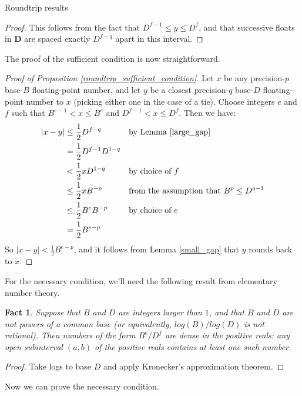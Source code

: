 \documentclass{article}
\theoremstyle{plain}
\newtheorem{fact}[lemma]{Fact}
\theoremstyle{definition}
\begin{document}
\begin{section}{Roundtrip results}
\begin{proof}
  This follows from the fact that $D^{f-1} \le y \le D^f$, and that successive
  floats in $\mathbf D$ are spaced exactly $D^{f-q}$ apart in this interval.
\end{proof}

The proof of the sufficient condition is now straightforward.

\begin{proof}[Proof of Proposition \ref{roundtrip_sufficient_condition}]
  Let $x$ be any precision-$p$ base-$B$ floating-point number, and let $y$ be a
  closest precision-$q$ base-$D$ floating-point number to $x$ (picking either
  one in the case of a tie).  Choose integers $e$ and $f$ such that $B^{e-1} <
  x \le B^e$ and $D^{f-1} < x \le D^f$. Then we have:
  \begin{align*}
    |x - y|
    &\le \frac12 D^{f-q} && \text{by Lemma \ref{large_gap}}\\
    &= \frac12 D^{f-1} D^{1-q} \\
    &< \frac12 x D^{1-q} && \text{by choice of $f$}\\
    &\le \frac12 x B^{-p} &&
                   \text{from the assumption that $B^p \le D^{q-1}$}\\
    &\le \frac12 B^e B^{-p} && \text{by choice of $e$}\\
    &= \frac12 B^{e-p} \\
  \end{align*}
  So $|x - y| < \frac12 B^{e-p}$, and it follows from Lemma \ref{small_gap}
  that $y$ rounds back to $x$.
\end{proof}

For the necessary condition, we'll need the following result from elementary
number theory.

\begin{fact}\label{dense_power_ratios}
  Suppose that $B$ and $D$ are integers larger than $1$, and that $B$ and $D$
  are not powers of a common base (or equivalently, $log(B) / log(D)$ is not
  rational). Then numbers of the form $B^e / D^f$ are \emph{dense} in the
  positive reals: any open subinterval $(a, b)$ of the positive reals contains
  at least one such number.
\end{fact}

\begin{proof}
  Take logs to base $D$ and apply Kronecker's approximation theorem.
\end{proof}

Now we can prove the necessary condition.


\end{section}
\end{document}
